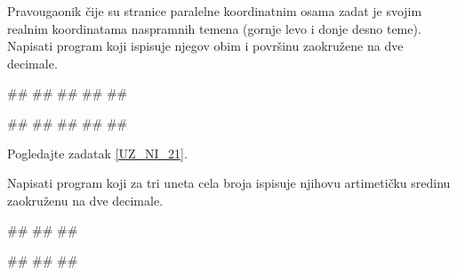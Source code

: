 \begin{Exercise}[label=UZ_NI_25] 
Pravougaonik čije su stranice paralelne koordinatnim osama zadat je svojim realnim 
koordinatama naspramnih temena (gornje levo i donje desno teme). Napisati program koji 
ispisuje njegov obim i površinu zaokružene na dve decimale. 

\begin{maxitest}
\begin{upotreba}{1}
#\naslovInt#
##
##
##
##
\end{upotreba}
\end{maxitest}

\begin{maxitest}
\begin{upotreba}{2}
#\naslovInt#
##
##
##
##
\end{upotreba}
\end{maxitest}
\end{Exercise}
\ifresenja
\begin{Answer}[ref=UZ_NI_25]
Pogledajte zadatak \ref{UZ_NI_21}.
\end{Answer}
\fi


\begin{Exercise}[label=UZ_NI_26] 
Napisati program koji za tri uneta cela broja ispisuje njihovu artimetičku sredinu zaokruženu na dve decimale.

\begin{miditest}
\begin{upotreba}{1}
#\naslovInt#
##
##
\end{upotreba}
\end{miditest}
\begin{miditest}
\begin{upotreba}{2}
#\naslovInt#
##
##
\end{upotreba}
\end{miditest}

\end{Exercise}
\ifresenja
\begin{Answer}[ref=UZ_NI_26]
\end{Answer}
\fi


